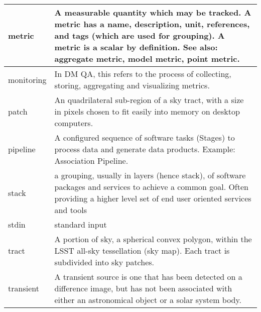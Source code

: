\begin{longtable}{|p{}|p{}|}
metric & A measurable quantity which may be tracked. A metric has a name, description, unit, references, and tags (which are used for grouping). A metric is a scalar by definition. See also: aggregate metric, model metric, point metric. \\\hline
monitoring & In DM QA, this refers to the process of collecting, storing, aggregating and visualizing metrics. \\\hline
patch & An quadrilateral sub-region of a sky tract, with a size in pixels chosen to fit easily into memory on desktop computers. \\\hline
pipeline & A configured sequence of software tasks (Stages) to process data and generate data products. Example: Association Pipeline. \\\hline
stack & a grouping, usually in layers (hence stack), of software packages and services to achieve a common goal. Often providing a higher level set of end user oriented services and tools \\\hline
stdin & standard input \\\hline
tract & A portion of sky, a spherical convex polygon, within the LSST all-sky tessellation (sky map). Each tract is subdivided into sky patches. \\\hline
transient & A transient source is one that has been detected on a difference image, but has not been associated with either an astronomical object or a solar system body. \\\hline
\end{longtable}
